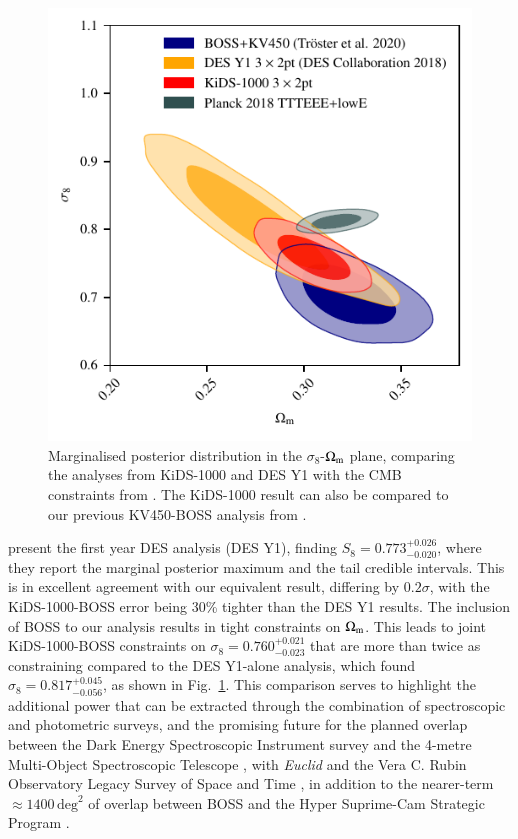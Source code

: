 \begin{figure}
	\begin{center}
		\includegraphics[width=\columnwidth]{Parameter_Plots/cosmology/omegam_sigma8_survey_comparison}
		\caption{Marginalised posterior distribution in the $\sigma_8$-$\Omega_{\rm m}$ plane, comparing the \tttp analyses from KiDS-1000 and DES Y1 \citep{abbott/etal:2018} with the CMB constraints from \citet{planck/etal:2018}.   The KiDS-1000 \tttp result can also be compared to our previous KV450-BOSS analysis from \citet{troester/etal:2020}. 
		\label{fig:DES_KiDS_comp}}
	\end{center}
\end{figure}


\citet{abbott/etal:2018} present the first year \tttp DES analysis (DES Y1), finding $S_8=0.773^{+0.026}_{-0.020}$, where they report the marginal posterior maximum and the tail credible intervals.  
This is in excellent agreement with our equivalent result, differing by $0.2\sigma$, with the KiDS-1000-BOSS error being 30\% tighter than the DES Y1 results.  The inclusion of BOSS to our \tttp analysis results in tight constraints on $\Omega_{\rm m}$.  
This leads to joint KiDS-1000-BOSS constraints on $\sigma_8=0.760^{+0.021}_{-0.023}$ that are more than twice as constraining compared to the DES Y1-alone \tttp analysis, which found $\sigma_8=0.817^{+0.045}_{-0.056}$, as shown in Fig.~\ref{fig:DES_KiDS_comp}. 
This comparison serves to highlight the additional power that can be extracted through the combination of spectroscopic and photometric surveys,  and the promising future for the planned overlap between the Dark Energy Spectroscopic Instrument survey \citep{DESI/etal:2016} and the 4-metre Multi-Object Spectroscopic Telescope \citep[4MOST,][]{richard/etal:2019},
with {\it Euclid} and the Vera C. Rubin Observatory Legacy Survey of Space and Time \citep{laureijs/etal:2011,lsst/etal:2009}, in addition to the nearer-term $\approx\!1400\,\mathrm{deg}^{2}$ of overlap between BOSS and the Hyper Suprime-Cam Strategic Program \citep[HSC,][]{aihara/etal:2019}. 

